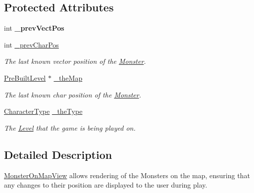 \subsection*{Protected Attributes}
\begin{DoxyCompactItemize}
\item 
\hypertarget{class_monster_on_map_view_aa5af57d72caa0ec610ac7d4a264f188c}{}\label{class_monster_on_map_view_aa5af57d72caa0ec610ac7d4a264f188c} 
int {\bfseries \+\_\+prev\+Vect\+Pos}
\item 
\hypertarget{class_monster_on_map_view_a0dc5d087c778a6d6cf0ebcd12976c219}{}\label{class_monster_on_map_view_a0dc5d087c778a6d6cf0ebcd12976c219} 
int \hyperlink{class_monster_on_map_view_a0dc5d087c778a6d6cf0ebcd12976c219}{\+\_\+prev\+Char\+Pos}
\begin{DoxyCompactList}\small\item\em The last known vector position of the \hyperlink{class_monster}{Monster}. \end{DoxyCompactList}\item 
\hypertarget{class_monster_on_map_view_a48d69301ce79af73f8358e53ce728ec4}{}\label{class_monster_on_map_view_a48d69301ce79af73f8358e53ce728ec4} 
\hyperlink{class_pre_built_level}{Pre\+Built\+Level} $\ast$ \hyperlink{class_monster_on_map_view_a48d69301ce79af73f8358e53ce728ec4}{\+\_\+the\+Map}
\begin{DoxyCompactList}\small\item\em The last known char position of the \hyperlink{class_monster}{Monster}. \end{DoxyCompactList}\item 
\hypertarget{class_monster_on_map_view_a9391e73ba7d92f9d2da534becfcbb1e6}{}\label{class_monster_on_map_view_a9391e73ba7d92f9d2da534becfcbb1e6} 
\hyperlink{namespaces_8h_ad0cd52c7c9b13be13f9aafebd2e1c860}{Character\+Type} \hyperlink{class_monster_on_map_view_a9391e73ba7d92f9d2da534becfcbb1e6}{\+\_\+the\+Type}
\begin{DoxyCompactList}\small\item\em The \hyperlink{class_level}{Level} that the game is being played on. \end{DoxyCompactList}\end{DoxyCompactItemize}


\subsection{Detailed Description}
\hyperlink{class_monster_on_map_view}{Monster\+On\+Map\+View} allows rendering of the Monsters on the map, ensuring that any changes to their position are displayed to the user during play. 

